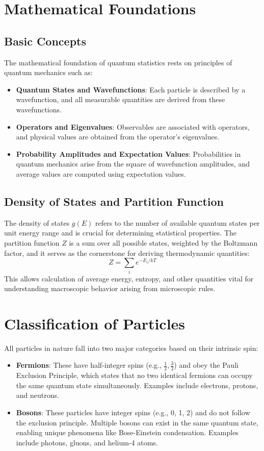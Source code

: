 \documentclass[12pt,a4paper]{article}
\begin{document}
\section{Mathematical Foundations}
\subsection{Basic Concepts}
The mathematical foundation of quantum statistics rests on principles of quantum mechanics such as:
\begin{itemize}
    \item \textbf{Quantum States and Wavefunctions}: Each particle is described by a wavefunction, and all measurable quantities are derived from these wavefunctions.
    \item \textbf{Operators and Eigenvalues}: Observables are associated with operators, and physical values are obtained from the operator's eigenvalues.
    \item \textbf{Probability Amplitudes and Expectation Values}: Probabilities in quantum mechanics arise from the square of wavefunction amplitudes, and average values are computed using expectation values.
\end{itemize}

\subsection{Density of States and Partition Function}
The density of states $g(E)$ refers to the number of available quantum states per unit energy range and is crucial for determining statistical properties. The partition function $Z$ is a sum over all possible states, weighted by the Boltzmann factor, and it serves as the cornerstone for deriving thermodynamic quantities:
\begin{equation}
Z = \sum_i e^{-E_i / kT}
\end{equation}
This allows calculation of average energy, entropy, and other quantities vital for understanding macroscopic behavior arising from microscopic rules.

\section{Classification of Particles}
All particles in nature fall into two major categories based on their intrinsic spin:
\begin{itemize}
    \item \textbf{Fermions}: These have half-integer spins (e.g., $\frac{1}{2}, \frac{3}{2}$) and obey the Pauli Exclusion Principle, which states that no two identical fermions can occupy the same quantum state simultaneously. Examples include electrons, protons, and neutrons.
    \item \textbf{Bosons}: These particles have integer spins (e.g., 0, 1, 2) and do not follow the exclusion principle. Multiple bosons can exist in the same quantum state, enabling unique phenomena like Bose-Einstein condensation. Examples include photons, gluons, and helium-4 atoms.
\end{itemize}
\end{document}
